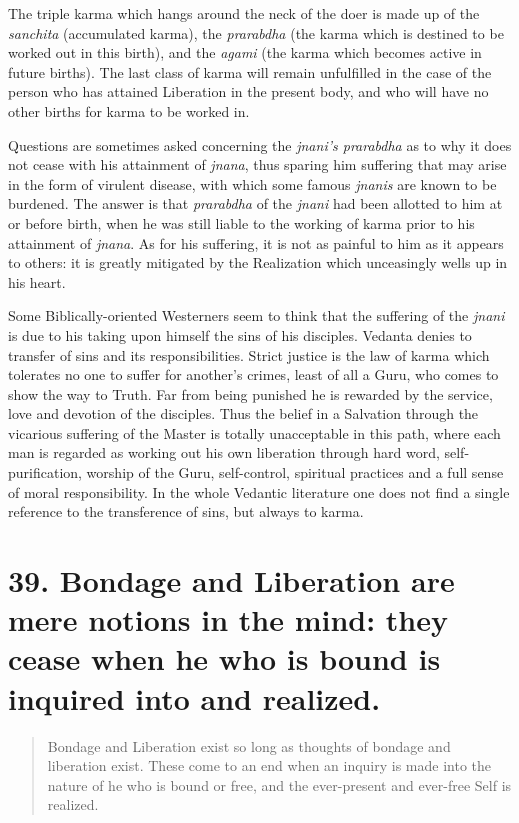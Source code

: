 \documentclass[12pt]{report}
\begin{document}
The triple karma which hangs around the neck of the doer is made up of
the \emph{sanchita} (accumulated karma), the \emph{prarabdha} (the
karma which is destined to be worked out in this birth), and the
\emph{agami} (the karma which becomes active in future births). The
last class of karma will remain unfulfilled in the case of the person
who has attained Liberation in the present body, and who will have no
other births for karma to be worked in.

Questions are sometimes asked concerning the \emph{jnani's prarabdha}
as to why it does not cease with his attainment of \emph{jnana}, thus
sparing him suffering that may arise in the form of virulent disease,
with which some famous \emph{jnanis} are known to be burdened. The
answer is that \emph{prarabdha} of the \emph{jnani} had been allotted
to him at or before birth, when he was still liable to the working of
karma prior to his attainment of \emph{jnana}. As for his suffering,
it is not as painful to him as it appears to others: it is greatly
mitigated by the Realization which unceasingly wells up in his heart.

Some Biblically-oriented Westerners seem to think that the suffering
of the \emph{jnani} is due to his taking upon himself the sins of his
disciples. Vedanta denies to transfer of sins and its
responsibilities. Strict justice is the law of karma which tolerates
no one to suffer for another's crimes, least of all a Guru, who comes
to show the way to Truth. Far from being punished he is rewarded by
the service, love and devotion of the disciples. Thus the belief in a
Salvation through the vicarious suffering of the Master is totally
unacceptable in this path, where each man is regarded as working out
his own liberation through hard word, self-purification, worship of
the Guru, self-control, spiritual practices and a full sense of moral
responsibility. In the whole Vedantic literature one does not find a
single reference to the transference of sins, but always to karma.


\section{39. Bondage and Liberation are mere notions in the mind: they
cease when he who is bound is inquired into and realized.}

\begin{quote}
  Bondage and Liberation exist so long as thoughts of bondage and
  liberation exist. These come to an end when an inquiry is made into
  the nature of he who is bound or free, and the ever-present and
  ever-free Self is realized.
\end{quote}
\end{document}

